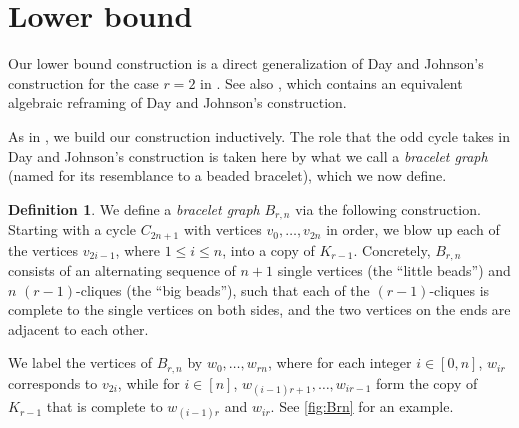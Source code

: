 \documentclass[reqno]{amsart}
\theoremstyle{remark}
\theoremstyle{definition}
\newtheorem{definition}[theorem]{Definition}
\numberwithin{theorem}{section}
\renewcommand{\le}{\leqslant}
\begin{document}
\section{Lower bound}
\label{sec:lb}

Our lower bound construction is a direct generalization of Day and Johnson's construction for the case $r=2$ in
\cite{DayJohnson2017MulticolourRamseyOddCycles}. See also \cite{zhu2025}, which contains an equivalent algebraic reframing of Day and Johnson's construction.

As in \cite{DayJohnson2017MulticolourRamseyOddCycles}, we build our construction inductively. The role that the odd cycle takes in Day and Johnson's construction is taken here by what we call a \emph{bracelet graph} (named for its resemblance to a beaded bracelet), which we now define.

\begin{definition}
    We define a \emph{bracelet graph} $B_{r,n}$ via the following construction. Starting with a cycle $C_{2n+1}$ with vertices $v_0,\dots,v_{2n}$ in order, we blow up each of the vertices $v_{2i-1}$, where $1\le i\le n$, into a copy of $K_{r-1}$. Concretely, $B_{r,n}$ consists of an alternating sequence of $n+1$ single vertices (the ``little beads'') and $n$ $(r-1)$-cliques (the ``big beads''), such that each of the $(r-1)$-cliques is complete to the single vertices on both sides, and the two vertices on the ends are adjacent to each other.
\end{definition}



We label the vertices of $B_{r,n}$ by $w_0,\dots,w_{rn}$, where for each integer $i\in [0,n]$, $w_{ir}$ corresponds to $v_{2i}$, while for $i\in [n]$, $w_{(i-1)r+1},\dots,w_{ir-1}$ form the copy of $K_{r-1}$ that is complete to $w_{(i-1)r}$ and $w_{ir}$. See \cref{fig:Brn} for an example.
\end{document}
